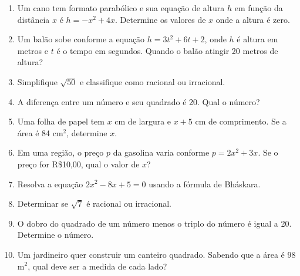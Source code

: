 \documentclass[12pt,a4paper]{article}
\begin{document}
\begin{enumerate}
\item Um cano tem formato parab\'olico e sua equa\c{c}\~ao de altura \(h\) em fun\c{c}\~ao da dist\^{a}ncia \(x\) \'e \(h = -x^2 + 4x\). Determine os valores de \(x\) onde a altura \'e zero.

\item Um bal\~ao sobe conforme a equa\c{c}\~ao \(h = 3t^2 + 6t + 2\), onde \(h\) \'e altura em metros e \(t\) \'e o tempo em segundos. Quando o bal\~ao atingir 20 metros de altura?

\item Simplifique \(\sqrt{50}\) e classifique como racional ou irracional.

\item A diferen\c{c}a entre um n\'umero e seu quadrado \'e 20. Qual o n\'umero?

\item Uma folha de papel tem \(x\) cm de largura e \(x+5\) cm de comprimento. Se a \'{a}rea \'e 84 cm$^2$, determine \(x\).

\item Em uma regi\~ao, o pre\c{c}o \(p\) da gasolina varia conforme \(p = 2x^2 + 3x\). Se o pre\c{c}o for R\$10,00, qual o valor de \(x\)?

\item Resolva a equa\c{c}\~ao \(2x^2 - 8x + 5 = 0\) usando a f\'ormula de Bh\'askara.

\item Determinar se \(\sqrt{7}\) \'e racional ou irracional.

\item O dobro do quadrado de um n\'umero menos o triplo do n\'umero \'e igual a 20. Determine o n\'umero.

\item Um jardineiro quer construir um canteiro quadrado. Sabendo que a \'{a}rea \'e 98 m$^2$, qual deve ser a medida de cada lado?


\end{enumerate}
\end{document}
